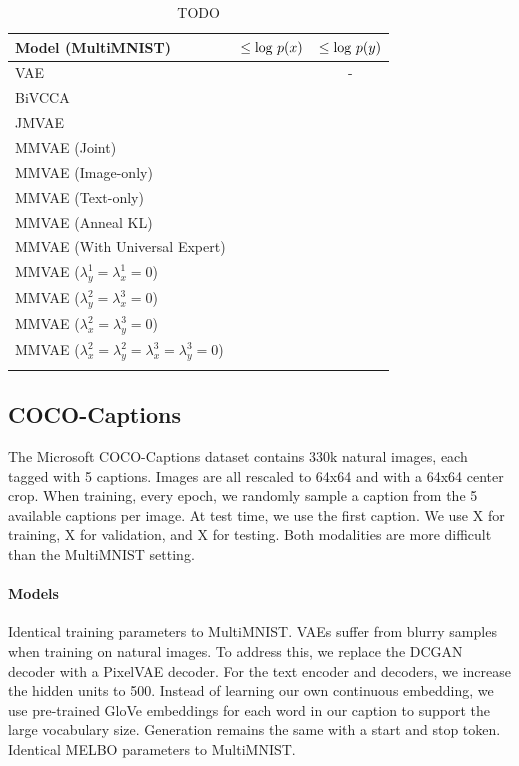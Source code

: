 \documentclass{article}
\begin{document}
\begin{table}[!h]
    \centering
    \begin{tabular}{ l | c | c }
        Model (MultiMNIST) & $\leq \textup{log }p(x)$ & $\leq \textup{log }p(y)$ \\
        \hline
        VAE & & - \\
        BiVCCA & &  \\
        JMVAE & & \\
        MMVAE (Joint) & & \\
        MMVAE (Image-only) & & \\
        MMVAE (Text-only) & & \\
        MMVAE (Anneal KL) & & \\
        MMVAE (With Universal Expert) & & \\
        MMVAE ($\lambda_{y}^{1} = \lambda_{x}^{1} = 0$) & & \\
        MMVAE ($\lambda_{y}^{2} = \lambda_{x}^{3} = 0$) & & \\
        MMVAE ($\lambda_{x}^{2} = \lambda_{y}^{3} = 0$) & & \\
        MMVAE ($\lambda_{x}^{2} = \lambda_{y}^{2} = \lambda_{x}^{3} = \lambda_{y}^{3} = 0$) & & \\
        \newline
    \end{tabular}
    \caption{TODO}
    \label{table:multimnist:marginal}
\end{table}

\subsection{COCO-Captions}

The Microsoft COCO-Captions dataset contains 330k natural images, each tagged with 5 captions. Images are all rescaled to 64x64 and with a 64x64 center crop. When training, every epoch, we randomly sample a caption from the 5 available captions per image. At test time, we use the first caption. We use X for training, X for validation, and X for testing. Both modalities are more difficult than the MultiMNIST setting.

\paragraph{Models} Identical training parameters to MultiMNIST. VAEs suffer from blurry samples when training on natural images. To address this, we replace the DCGAN decoder with a PixelVAE decoder. For the text encoder and decoders, we increase the hidden units to 500. Instead of learning our own continuous embedding, we use pre-trained GloVe embeddings for each word in our caption to support the large vocabulary size. Generation remains the same with a start and stop token. Identical MELBO parameters to MultiMNIST.
\end{document}
